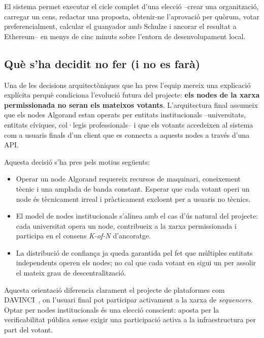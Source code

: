 El sistema permet executar el cicle complet d'una elecció --crear una organització, carregar un cens, redactar una
proposta, obtenir-ne l'aprovació per quòrum, votar preferencialment, calcular el guanyador amb Schulze i ancorar el
resultat a Ethereum-- en menys de cinc minuts sobre l'entorn de desenvolupament local.

\subsection{Què s'ha decidit no fer (i no es farà)}
\label{subsec:que-s'ha-decidit-no-fer-(i-no-es-fara)}

Una de les decisions arquitectòniques que ha pres l'equip mereix una explicació explícita perquè condiciona l'evolució
futura del projecte: \textbf{els nodes de la xarxa permissionada no seran els mateixos votants}.
L'arquitectura final assumeix que els nodes Algorand estan operats per entitats institucionals --universitats, entitats
cíviques, col·legis professionals-- i que els votants accedeixen al sistema com a usuaris finals d'un client que es
connecta a aquests nodes a través d'una \ac{API}.

Aquesta decisió s'ha pres pels motius següents:

\begin{itemize}
    \item Operar un node Algorand requereix recursos de maquinari, coneixement tècnic i una amplada de banda constant.
    Esperar que cada votant operi un node és tècnicament irreal i pràcticament excloent per a usuaris no tècnics.

    \item El model de nodes institucionals s'alinea amb el cas d'ús natural del projecte: cada universitat opera un
    node, contribueix a la xarxa permissionada i participa en el consens \textit{K-of-N} d'ancoratge.

    \item La distribució de confiança ja queda garantida pel fet que múltiples entitats independents operen els nodes;
    no cal que cada votant en sigui un per assolir el mateix grau de descentralització.
\end{itemize}

Aquesta orientació diferencia clarament el projecte de plataformes com DAVINCI~\cite{vocdoni2026davinci}, on l'usuari
final pot participar activament a la xarxa de \emph{sequencers}.
Optar per nodes institucionals és una elecció conscient: aposta per la verificabilitat pública sense exigir una
participació activa a la infraestructura per part del votant.

